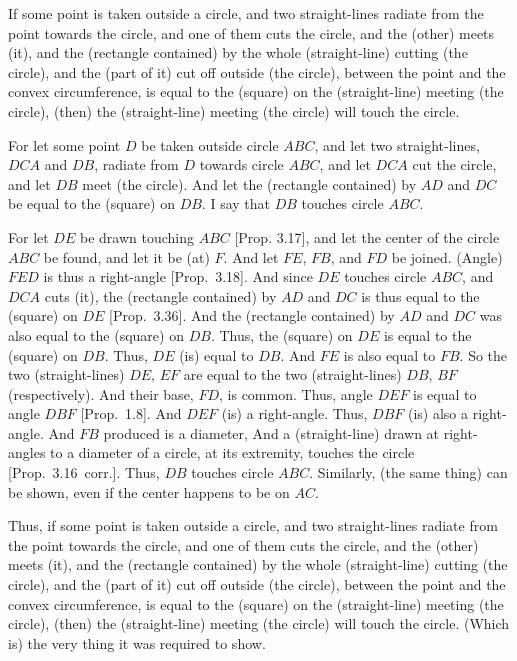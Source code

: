 \begin{Parallel}{}{}
{If some point is taken outside a circle, and two straight-lines radiate
from the point towards the circle, and one of them cuts the circle, and the
(other) meets (it), and the (rectangle contained) by the whole (straight-line)
cutting (the circle), and the (part of it) 
cut off outside (the circle),
between the point and the convex circumference,  is equal to the (square)
on the (straight-line) meeting (the circle), (then) the (straight-line)
meeting (the circle) will touch the circle.

For let some point $D$ be taken outside circle $ABC$, and let two
straight-lines, $DCA$ and $DB$, radiate from $D$ towards circle $ABC$, and
let $DCA$ cut the circle, and let $DB$ meet (the circle). And let the (rectangle
contained) by $AD$ and $DC$ be equal to the (square) on $DB$. I say that $DB$ touches circle $ABC$.

\epsfysize=1.75in
\centerline{}

For let $DE$ be drawn touching $ABC$ [Prop. 3.17], and let the center of the circle
$ABC$ be found, and let it be (at) $F$. And let $FE$, $FB$, and $FD$ 
be joined. (Angle) $FED$ is thus a right-angle [Prop.~3.18].
And since $DE$ touches circle $ABC$, and $DCA$ cuts (it), the (rectangle contained) by $AD$ and $DC$ is thus equal to the (square) on $DE$ [Prop.~3.36]. And the (rectangle contained) by $AD$ and $DC$ was also equal
to the (square) on $DB$.  Thus, the (square) on $DE$ is equal to the
(square) on $DB$. Thus, $DE$ (is) equal to $DB$. And $FE$ is also equal to
$FB$. So the two (straight-lines) $DE$, $EF$ are equal to the two (straight-lines)
$DB$, $BF$ (respectively).  And their base, $FD$, is common. Thus, angle $DEF$ is equal to
angle $DBF$ [Prop.~1.8]. And $DEF$ (is) a right-angle. Thus, $DBF$
(is) also a right-angle. And $FB$ produced is a diameter, And a (straight-line)
drawn at right-angles to a diameter of a circle, at its extremity, touches the
circle [Prop.~3.16~corr.]. Thus, $DB$ touches circle $ABC$. 
Similarly, (the same thing) can be shown, even if the center happens to be
on $AC$.

Thus, if some point is taken outside a circle, and two straight-lines radiate
from the point towards the circle, and one of them cuts the circle, and the
(other) meets (it), and the (rectangle contained) by the whole (straight-line)
cutting (the circle), and the (part of it) 
cut off outside (the circle),
between the point and the convex circumference,  is equal to the (square)
on the (straight-line) meeting (the circle), (then) the (straight-line)
meeting (the circle) will touch the circle. (Which is) the very thing it was
required to show.}
\end{Parallel}

\newpage~\thispagestyle{empty}
